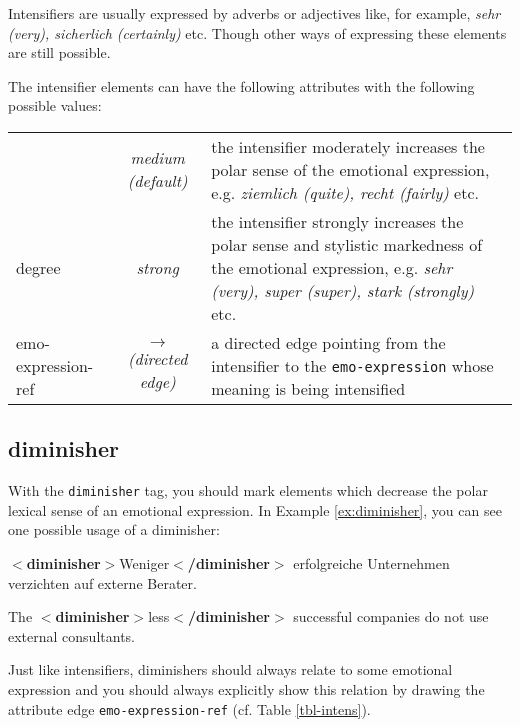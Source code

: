 \documentclass[11pt,a4paper]{article}
\newcommand{\xmltag}[1]{{\textbf{\small$<$#1$>$}}}
\newcommand{\diminisher}[1]{\xmltag{diminisher}#1\xmltag{/diminisher}}
\newlength\clmnwidth
\newenvironment{myexe}{
  \begin{exe}
    \ex\begin{center}
    \itshape
}{
    \end{center}
  \end{exe}
}
\begin{document}
Intensifiers are usually expressed by adverbs or adjectives like, for example,
\textit{sehr (very), sicherlich (certainly)} etc.  Though other ways of
expressing these elements are still possible.

The intensifier elements can have the following attributes with the
following possible values:
\begin{center}
  \begin{tabular}{|l|c|p{\clmnwidth}|}\hline\label{tbl-intens}

    & \textit{medium (default)} & the intensifier moderately increases
    the polar sense of the emotional expression, e.g. \textit{ziemlich
      (quite), recht (fairly)} etc.\\\cline{2-3}

    \multirow{-2}{*}{degree} & \textit{strong} & the intensifier
    strongly increases the polar sense and stylistic markedness of the
    emotional expression, e.g. \textit{sehr (very), super (super),
      stark (strongly)} etc.\\\hline


    emo-expression-ref & \textit{$\longrightarrow$\newline(directed
      edge)} & a directed edge pointing from the intensifier to the
    \texttt{emo-expression} whose meaning is being intensified\\\hline
  \end{tabular}
\end{center}

\subsection{diminisher}
With the \texttt{diminisher} tag, you should mark elements which decrease the
polar lexical sense of an emotional expression.  In Example
\ref{ex:diminisher}, you can see one possible usage of a diminisher:
\begin{myexe}
  \diminisher{Weniger} erfolgreiche Unternehmen verzichten auf externe
  Berater.\label{ex:diminisher}

  The \diminisher{less} successful companies do not use external
  consultants.
\end{myexe}
Just like intensifiers, diminishers should always relate to some emotional
expression and you should always explicitly show this relation by drawing the
attribute edge \texttt{emo-expression-ref} (cf. Table \ref{tbl-intens}).
\end{document}
